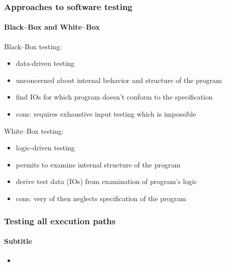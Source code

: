 \documentclass{beamer}
\begin{document}

\begin{frame}[fragile]
    \frametitle{Approaches to software testing}
    \framesubtitle{Black--Box and White--Box}

    Black--Box testing:
    \begin{itemize}
        \item data-driven testing
        \item unconcerned about internal behavior and structure of the program
        \item find IOs for which program doesn't conform to the specification
        \item {\color{red} cons}: requires exhaustive input testing which is impossible
    \end{itemize}
    White--Box testing:
    \begin{itemize}
        \item logic-driven testing
        \item permits to examine internal structure of the program
        \item derive test data (IOs) from examination of program's logic
        \item {\color{red} cons}: very of then neglects specification of the program
    \end{itemize}
\end{frame}

\begin{frame}[fragile]
    \frametitle{Testing all execution paths}
    \framesubtitle{Subtitle}

    \begin{itemize}
        \item
    \end{itemize}
\end{frame}
\end{document}
